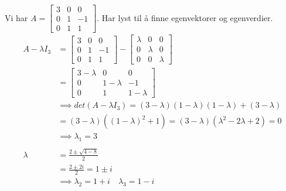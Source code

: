 \documentclass[11pt, a4paper, norsk]{article}
\begin{document}
        \begin{Example}{}{}
            Vi har $A = \begin{bmatrix}
                3 & 0 & 0 \\
                0 & 1 & -1 \\
                0 & 1 & 1
            \end{bmatrix}$. Har lyst til å finne egenvektorer og egenverdier.
            \begin{align*}
                A - \lambda I_{3} &= \begin{bmatrix}
                    3 & 0 & 0 \\
                    0 & 1 & -1 \\
                    0 & 1 & 1
                \end{bmatrix} - \begin{bmatrix}
                    \lambda & 0 & 0 \\
                    0 & \lambda & 0 \\
                    0 & 0 & \lambda
                \end{bmatrix}
                \\
                                  &= \begin{bmatrix}
                                      3 - \lambda & 0 & 0 \\
                                      0 & 1 - \lambda & -1 \\
                                      0 & 1 & 1-\lambda
                                  \end{bmatrix}
                                  \\
                                  &\implies det(A - \lambda I_3) = (3-\lambda)(1 - \lambda)(1 - \lambda) + (3-\lambda)
                                  \\
                                  &= (3-\lambda)((1-\lambda)^2 + 1) = (3-\lambda)(\lambda^2-2\lambda+2) = 0 \\
                                  &\implies \lambda_1 = 3
                                  \\
                                  \\
                    \lambda &= \frac{2 \pm \sqrt{4-8}}{2} 
                    \\
                            &= \frac{2 \pm 2i}{2} = 1 \pm i
                            \\
                            &\implies \lambda_2 = 1+i \quad \lambda_3 = 1-i

\end{align*}
\end{Example}
\end{document}
